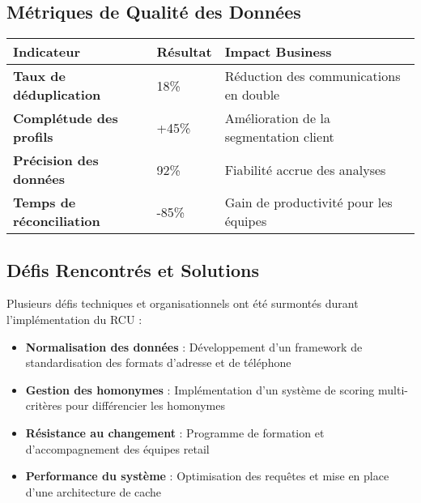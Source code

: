 \subsection{Métriques de Qualité des Données}

\begin{center}
\begin{tabular}{|>{\bfseries}p{5cm}|p{3cm}|p{5cm}|}
\hline
\rowcolor{lightblue} Indicateur & Résultat & Impact Business \\
\hline
Taux de déduplication & 18\% & Réduction des communications en double \\
\hline
Complétude des profils & +45\% & Amélioration de la segmentation client \\
\hline
Précision des données & 92\% & Fiabilité accrue des analyses \\
\hline
Temps de réconciliation & -85\% & Gain de productivité pour les équipes \\
\hline
\end{tabular}
\end{center}

\subsection{Défis Rencontrés et Solutions}

\begin{mdframed}[backgroundcolor=lightgreen!20, linewidth=1pt]
Plusieurs défis techniques et organisationnels ont été surmontés durant l'implémentation du RCU :

\begin{itemize}
    \item \textbf{Normalisation des données} : Développement d'un framework de standardisation des formats d'adresse et de téléphone
    \item \textbf{Gestion des homonymes} : Implémentation d'un système de scoring multi-critères pour différencier les homonymes
    \item \textbf{Résistance au changement} : Programme de formation et d'accompagnement des équipes retail
    \item \textbf{Performance du système} : Optimisation des requêtes et mise en place d'une architecture de cache
\end{itemize}
\end{mdframed}
